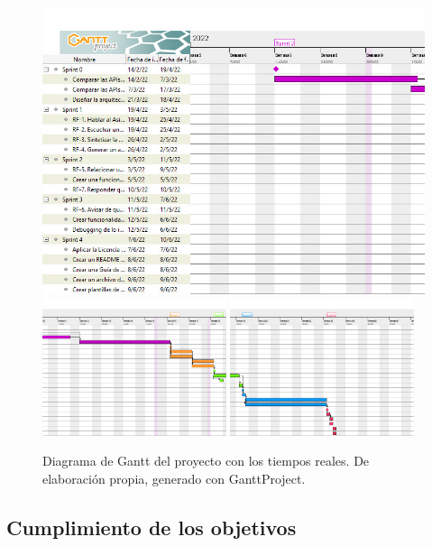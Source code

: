 \begin{figure}[h]
	\centering
	\includegraphics[width=\textwidth]{imagenes/GanttTR3.png} \\
	\includegraphics[width=0.48\textwidth]{imagenes/GanttTR2.png}
	\includegraphics[width=0.48\textwidth]{imagenes/GanttTR1.png}
	\caption[Diagrama de Gantt]{Diagrama de Gantt del proyecto con los tiempos reales. De elaboración propia, generado con GanttProject.}
	\label{fig:gantt_tr}
\end{figure}

\subsection{Cumplimiento de los objetivos}

